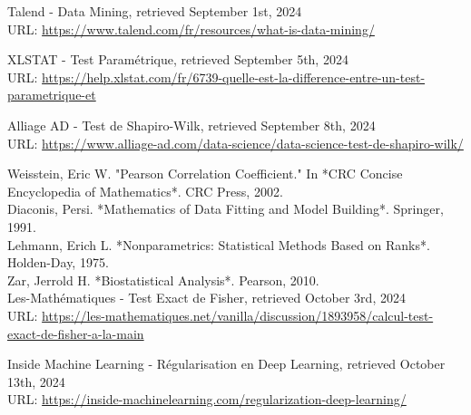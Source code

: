 \adjustmtc
\newpage
\renewcommand\bibname{Webographie}
\begin{thebibliography}{9}
\thispagestyle{MyStyle}


Talend - Data Mining, retrieved September 1st, 2024 \\ 
URL: \url{https://www.talend.com/fr/resources/what-is-data-mining/}

XLSTAT - Test Paramétrique, retrieved September 5th, 2024 \\ 
URL: \url{https://help.xlstat.com/fr/6739-quelle-est-la-difference-entre-un-test-parametrique-et}

Alliage AD - Test de Shapiro-Wilk, retrieved September 8th, 2024 \\ 
URL: \url{https://www.alliage-ad.com/data-science/data-science-test-de-shapiro-wilk/}

Weisstein, Eric W. "Pearson Correlation Coefficient." In *CRC Concise Encyclopedia of Mathematics*. CRC Press, 2002.\\

Diaconis, Persi. *Mathematics of Data Fitting and Model Building*. Springer, 1991.\\

Lehmann, Erich L. *Nonparametrics: Statistical Methods Based on Ranks*. Holden-Day, 1975.\\

Zar, Jerrold H. *Biostatistical Analysis*. Pearson, 2010.\\

Les-Mathématiques - Test Exact de Fisher, retrieved October 3rd, 2024 \\ 
URL: \url{https://les-mathematiques.net/vanilla/discussion/1893958/calcul-test-exact-de-fisher-a-la-main}

Inside Machine Learning - Régularisation en Deep Learning, retrieved October 13th, 2024 \\ 
URL: \url{https://inside-machinelearning.com/regularization-deep-learning/}


\end{thebibliography} 

